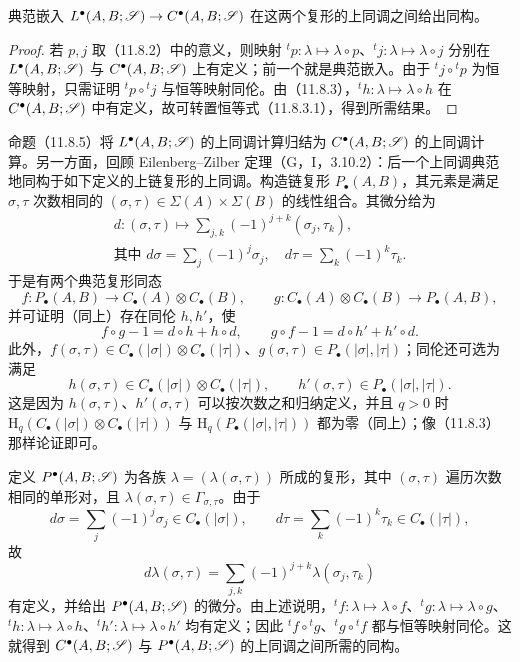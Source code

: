 典范嵌入 $L^\bullet(A,B;\mathscr S)\to C^\bullet(A,B;\mathscr S)$ 在这两个复形的上同调之间给出同构。
\begin{proof}
若 $p,j$ 取（11.8.2）中的意义，则映射 ${}^tp:\lambda\mapsto\lambda\circ p$、${}^tj:\lambda\mapsto\lambda\circ j$ 分别在 $L^\bullet(A,B;\mathscr S)$ 与 $C^\bullet(A,B;\mathscr S)$ 上有定义；前一个就是典范嵌入。由于 ${}^tj\circ{}^tp$ 为恒等映射，只需证明 ${}^tp\circ{}^tj$ 与恒等映射同伦。由（11.8.3），${}^th:\lambda\mapsto\lambda\circ h$ 在 $C^\bullet(A,B;\mathscr S)$ 中有定义，故可转置恒等式（11.8.3.1），得到所需结果。
\end{proof}

命题（11.8.5）将 $L^\bullet(A,B;\mathscr S)$ 的上同调计算归结为 $C^\bullet(A,B;\mathscr S)$ 的上同调计算。另一方面，回顾 Eilenberg--Zilber 定理（G，I，3.10.2）：后一个上同调典范地同构于如下定义的上链复形的上同调。构造链复形 $P_\bullet(A,B)$，其元素是满足 $\sigma,\tau$ 次数相同的 $(\sigma,\tau)\in\Sigma(A)\times\Sigma(B)$ 的线性组合。其微分给为
\[
\begin{gathered}
d:(\sigma,\tau)\longmapsto\sum_{j,k}(-1)^{j+k}(\sigma_j,\tau_k),\\
\text{其中 }d\sigma=\sum_j(-1)^j\sigma_j,\quad d\tau=\sum_k(-1)^k\tau_k.
\end{gathered}
\]
于是有两个典范复形同态
\[
f:P_\bullet(A,B)\to C_\bullet(A)\otimes C_\bullet(B),\qquad
g:C_\bullet(A)\otimes C_\bullet(B)\to P_\bullet(A,B),
\]
并可证明（同上）存在同伦 $h,h'$，使
\[
f\circ g-1=d\circ h+h\circ d,\qquad
g\circ f-1=d\circ h'+h'\circ d.
\]
此外，$f(\sigma,\tau)\in C_\bullet(|\sigma|)\otimes C_\bullet(|\tau|)$、$g(\sigma,\tau)\in P_\bullet(|\sigma|,|\tau|)$；同伦还可选为满足
\[
h(\sigma,\tau)\in C_\bullet(|\sigma|)\otimes C_\bullet(|\tau|),\qquad
h'(\sigma,\tau)\in P_\bullet(|\sigma|,|\tau|).
\]
这是因为 $h(\sigma,\tau)$、$h'(\sigma,\tau)$ 可以按次数之和归纳定义，并且 $q>0$ 时 $\mathrm H_q(C_\bullet(|\sigma|)\otimes C_\bullet(|\tau|))$ 与 $\mathrm H_q(P_\bullet(|\sigma|,|\tau|))$ 都为零（同上）；像（11.8.3）那样论证即可。

定义 $P^\bullet(A,B;\mathscr S)$ 为各族 $\lambda=(\lambda(\sigma,\tau))$ 所成的复形，其中 $(\sigma,\tau)$ 遍历次数相同的单形对，且 $\lambda(\sigma,\tau)\in\Gamma_{\sigma,\tau}$。由于
\[
d\sigma=\sum_j(-1)^j\sigma_j\in C_\bullet(|\sigma|),\qquad
d\tau=\sum_k(-1)^k\tau_k\in C_\bullet(|\tau|),
\]
故
\[
d\lambda(\sigma,\tau)=\sum_{j,k}(-1)^{j+k}\lambda(\sigma_j,\tau_k)
\]
有定义，并给出 $P^\bullet(A,B;\mathscr S)$ 的微分。由上述说明，${}^tf:\lambda\mapsto\lambda\circ f$、${}^tg:\lambda\mapsto\lambda\circ g$、${}^th:\lambda\mapsto\lambda\circ h$、${}^th':\lambda\mapsto\lambda\circ h'$ 均有定义；因此 ${}^tf\circ{}^tg$、${}^tg\circ{}^tf$ 都与恒等映射同伦。这就得到 $C^\bullet(A,B;\mathscr S)$ 与 $P^\bullet(A,B;\mathscr S)$ 的上同调之间所需的同构。

